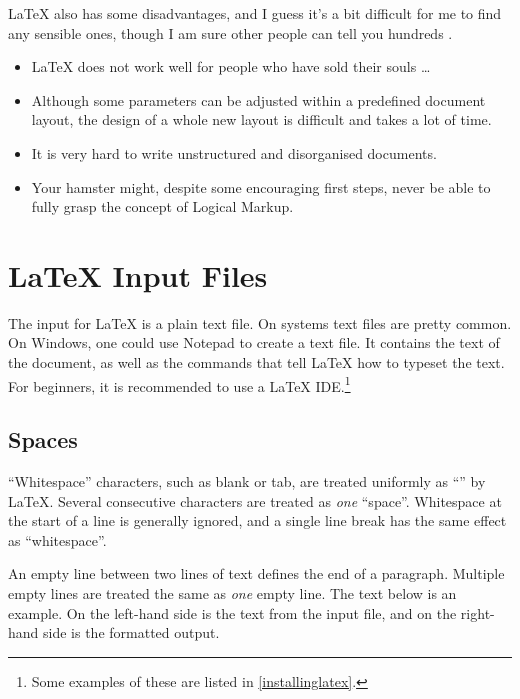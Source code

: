 \medskip

\noindent\LaTeX{} also has some disadvantages, and I guess it's a bit
difficult for me to find any sensible ones, though I am sure other people
can tell you hundreds \smiley.

\begin{itemize}
  \item \LaTeX{} does not work well for people who have sold their
        souls \ldots
  \item Although some parameters can be adjusted within a predefined
        document layout, the design of a whole new layout is difficult and
        takes a lot of time.
  \item It is very hard to write unstructured and disorganised documents.
  \item Your hamster might, despite some encouraging first steps, never be
        able to fully grasp the concept of Logical Markup.
\end{itemize}

\section{\LaTeX{} Input Files}

The input for \LaTeX{} is a plain text file. On \Unix{} systems text files are
pretty common. On Windows, one could use Notepad to create a text file. It
contains the text of the document, as well as the commands that tell \LaTeX{}
how to typeset the text. For beginners, it is recommended to use a \LaTeX{}
IDE.\footnote{Some examples of these are listed in
  \autoref{installinglatex}.}

\subsection{Spaces}\label{sec:spaces}

\enquote{Whitespace} characters, such as blank or tab, are treated uniformly as
\enquote{} by \LaTeX{}. Several consecutive 
characters are treated as \emph{one} \enquote{space}. Whitespace at the start
of a line is generally ignored, and a single line break has the same effect as
\enquote{whitespace}.

An empty line between two lines of text defines the end of a paragraph. Multiple
empty lines are treated the same as \emph{one} empty line. The text below is an
example. On the left-hand side is the text from the input file, and on the
right-hand side is the formatted output.

